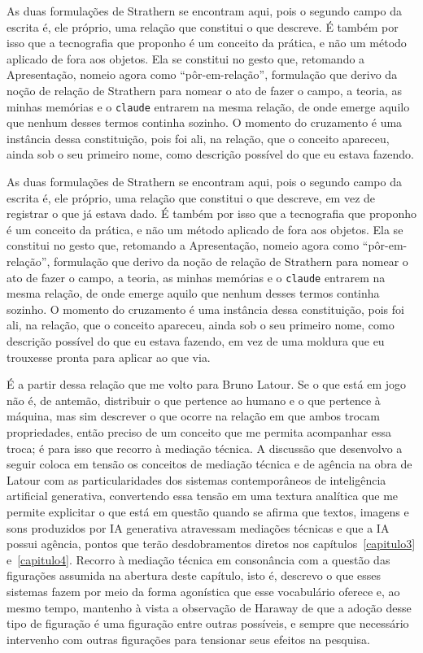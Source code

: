 As duas formulações de Strathern se encontram aqui, pois o segundo campo da escrita é, ele próprio, uma relação que constitui o que descreve. É também por isso que a tecnografia que proponho é um conceito da prática, e não um método aplicado de fora aos objetos. Ela se constitui no gesto que, retomando a Apresentação, nomeio agora como \enquote{pôr-em-relação}, formulação que derivo da noção de relação de Strathern para nomear o ato de fazer o campo, a teoria, as minhas memórias e o \texttt{claude} entrarem na mesma relação, de onde emerge aquilo que nenhum desses termos continha sozinho. O momento do cruzamento é uma instância dessa constituição, pois foi ali, na relação, que o conceito apareceu, ainda sob o seu primeiro nome, como descrição possível do que eu estava fazendo.

As duas formulações de Strathern se encontram aqui, pois o segundo campo da escrita é, ele próprio, uma relação que constitui o que descreve, em vez de registrar o que já estava dado. É também por isso que a tecnografia que proponho é um conceito da prática, e não um método aplicado de fora aos objetos. Ela se constitui no gesto que, retomando a Apresentação, nomeio agora como \enquote{pôr-em-relação}, formulação que derivo da noção de relação de Strathern para nomear o ato de fazer o campo, a teoria, as minhas memórias e o \texttt{claude} entrarem na mesma relação, de onde emerge aquilo que nenhum desses termos continha sozinho. O momento do cruzamento é uma instância dessa constituição, pois foi ali, na relação, que o conceito apareceu, ainda sob o seu primeiro nome, como descrição possível do que eu estava fazendo, em vez de uma moldura que eu trouxesse pronta para aplicar ao que via.

É a partir dessa relação que me volto para Bruno Latour. Se o que está em jogo não é, de antemão, distribuir o que pertence ao humano e o que pertence à máquina, mas sim descrever o que ocorre na relação em que ambos trocam propriedades, então preciso de um conceito que me permita acompanhar essa troca; é para isso que recorro à mediação técnica. A discussão que desenvolvo a seguir coloca em tensão os conceitos de mediação técnica e de agência na obra de Latour com as particularidades dos sistemas contemporâneos de inteligência artificial generativa, convertendo essa tensão em uma textura analítica que me permite explicitar o que está em questão quando se afirma que textos, imagens e sons produzidos por IA generativa atravessam mediações técnicas e que a IA possui agência, pontos que terão desdobramentos diretos nos capítulos~\ref{capitulo3} e~\ref{capitulo4}. Recorro à mediação técnica em consonância com a questão das figurações assumida na abertura deste capítulo, isto é, descrevo o que esses sistemas fazem por meio da forma agonística que esse vocabulário oferece e, ao mesmo tempo, mantenho à vista a observação de Haraway de que a adoção desse tipo de figuração é uma figuração entre outras possíveis, e sempre que necessário intervenho com outras figurações para tensionar seus efeitos na pesquisa. 

